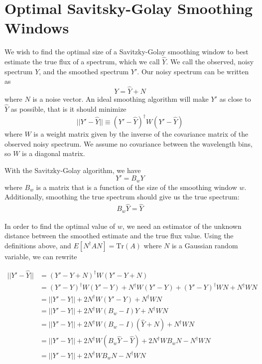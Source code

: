 \chapter{Optimal Savitsky-Golay Smoothing Windows}
\label{sg_optimal}
We wish to find the optimal size of a Savitzky-Golay smoothing window to best estimate the true flux of a spectrum, which we call $\hat{Y}$. We call the observed, noisy spectrum $Y$, and the smoothed spectrum $Y'$. Our noisy spectrum can be written as
\begin{equation}
    Y = \hat{Y}+N
\end{equation}
where $N$ is a noise vector. An ideal smoothing algorithm will make $Y'$ as close to $\hat{Y}$ as possible, that is it should minimize 
\begin{equation}
    ||Y'-\hat{Y}|| \equiv (Y'-\hat{Y})^\dagger W (Y'-\hat{Y})
\end{equation}
where $W$ is a weight matrix given by the inverse of the covariance matrix of the observed noisy spectrum. We assume no covariance between the wavelength bins, so $W$ is a diagonal matrix.

With the Savitzky-Golay algorithm, we have
\begin{equation}
    Y' = B_wY
\end{equation}
where $B_w$ is a matrix that is a function of the size of the smoothing window $w$. Additionally, smoothing the true spectrum should give us the true spectrum:
\begin{align}
    B_w\hat{Y}=\hat{Y}
\end{align}

In order to find the optimal value of $w$, we need an estimator of the unknown distance between the smoothed estimate and the true flux value. Using the definitions above, and $E[N^\dagger A N]=\mathrm{Tr}(A)$ where $N$ is a Gaussian random variable, we can rewrite

\begin{align*}
    ||Y'-\hat{Y}|| &= (Y'-Y+N)^\dagger W(Y'-Y+N)\\
    &= (Y'-Y)^\dagger W(Y'-Y)+N^\dagger W(Y'-Y) + (Y'-Y)^\dagger W N + N^\dagger W N\\
    &= ||Y'-Y||+2N^\dagger W(Y'-Y)+N^\dagger WN\\
    &= ||Y'-Y||+2N^\dagger W(B_w - I)Y + N^\dagger WN\\
    &= ||Y'-Y||+2N^\dagger W(B_w - I)(\hat{Y}+N) + N^\dagger WN\\
    &= ||Y'-Y||+2N^\dagger W (B_w\hat{Y}-\hat{Y}) + 2N^\dagger W B_w N - N^\dagger W N\\
    &= ||Y'-Y|| + 2N^\dagger W B_w N - N^\dagger W N
\end{align*}

